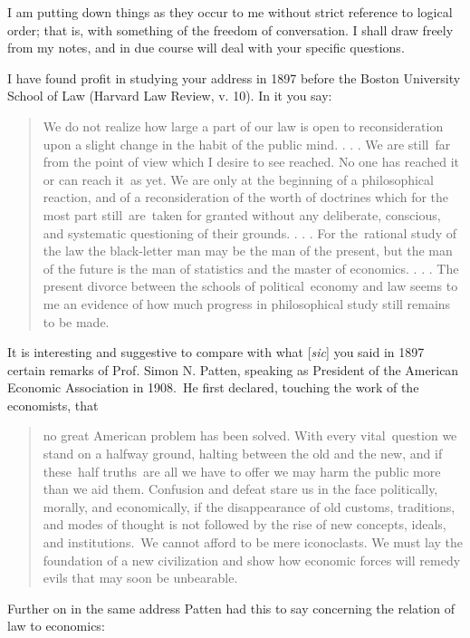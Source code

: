 \documentclass[openany,nobib]{tufte-book}
\begin{document}
I am putting down things as they occur to me without strict reference to
logical order; that is, with something of the freedom of conversation. I
shall draw freely from my notes, and in due course will deal with your
specific questions.~

I have found profit in studying your address in 1897 before the Boston
University School of Law (Harvard Law Review, v. 10). In it you say:~

\begin{quote}
We do not realize how large a part of our law is open to reconsideration
upon a slight change in the habit of the public mind. . . . We are
still~far from the point of view which I desire to see reached. No one
has reached it or can reach it~as yet. We are only at the beginning of a
philosophical reaction, and of a reconsideration of the worth of
doctrines which for the most part still~are~taken for granted without
any deliberate, conscious, and systematic questioning of their grounds.
. . . For the~rational study of the law the black-letter man may be the
man of the present, but the man of the future is the man of statistics
and the master of economics. . . . The present divorce between the
schools of political~economy and law seems to me an evidence of how much
progress in philosophical study still remains to be made.~
\end{quote}

It is interesting and suggestive to compare with what {[}\emph{sic}{]}
you said in 1897 certain remarks of Prof. Simon N. Patten, speaking as
President of the American Economic Association in 1908.~He first
declared, touching the work of the economists, that~

\begin{quote}
no great American problem has been solved. With every vital~question we
stand on a halfway ground, halting between the old and the new, and if
these~half truths~are all we have to offer we may harm the public more
than we aid them. Confusion and defeat stare us in the face politically,
morally, and economically, if the disappearance of old customs,
traditions, and modes of thought is not followed by the rise of new
concepts, ideals, and institutions.~We cannot afford to be mere
iconoclasts. We must lay the foundation of a new civilization and show
how economic forces will remedy evils that may soon be unbearable.~
\end{quote}

Further on in the same address Patten had this to say concerning the
relation of law to economics:~
\end{document}
